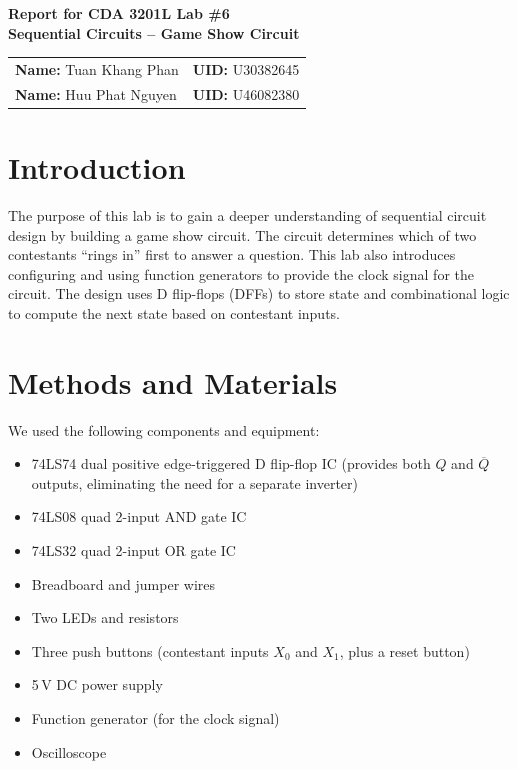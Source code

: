 \documentclass[12pt, letterpaper]{article}
\begin{document}
\begin{center}
  {\Large \textbf{Report for CDA 3201L Lab \#6}}\\[10pt]
  {\large \textbf{Sequential Circuits -- Game Show Circuit}}\\[20pt]
  \begin{tabular}{ll}
    \textbf{Name:} Tuan Khang Phan & \textbf{UID:} U30382645 \\[4pt]
    \textbf{Name:} Huu Phat Nguyen & \textbf{UID:} U46082380 \\
  \end{tabular}
\end{center}

\section{Introduction}

The purpose of this lab is to gain a deeper understanding of sequential circuit design by building a game show circuit. The circuit determines which of two contestants ``rings in'' first to answer a question. This lab also introduces configuring and using function generators to provide the clock signal for the circuit. The design uses D flip-flops (DFFs) to store state and combinational logic to compute the next state based on contestant inputs.

\section{Methods and Materials}

We used the following components and equipment:

\begin{itemize}
  \item 74LS74 dual positive edge-triggered D flip-flop IC (provides both $Q$ and $\overline{Q}$ outputs, eliminating the need for a separate inverter)
  \item 74LS08 quad 2-input AND gate IC
  \item 74LS32 quad 2-input OR gate IC
  \item Breadboard and jumper wires
  \item Two LEDs and resistors
  \item Three push buttons (contestant inputs $X_0$ and $X_1$, plus a reset button)
  \item 5\,V DC power supply
  \item Function generator (for the clock signal)
  \item Oscilloscope
\end{itemize}
\end{document}
